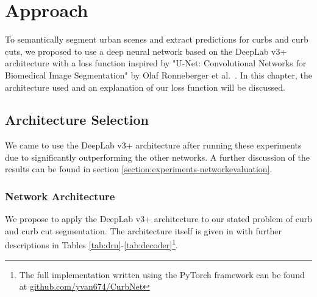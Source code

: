 \chapter{Approach}\label{chap:approach}
To semantically segment urban scenes and extract predictions for curbs and curb cuts, we proposed to use a deep neural network based on the DeepLab v3+ architecture with a loss function inspired by "U-Net: Convolutional Networks for Biomedical Image Segmentation" by Olaf Ronneberger et al.~\cite{unet}.
In this chapter, the architecture used and an explanation of our loss function will be discussed.

\section{Architecture Selection} \label{section:approach-architectureselection}
We came to use the DeepLab v3+ architecture after running these experiments due to significantly outperforming the other networks. A further discussion of the results can be found in section \ref{section:experiments-networkevaluation}.

\subsection{Network Architecture}\label{section:approach-networkarchitecture}
We propose to apply the DeepLab v3+ architecture to our stated problem of curb and curb cut segmentation.
The architecture itself is given in  with further descriptions in Tables \ref{tab:drn}-\ref{tab:decoder}\footnote{The full implementation written using the PyTorch framework can be found at \url{github.com/yvan674/CurbNet}}.







